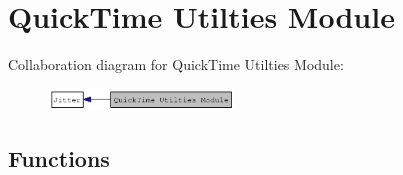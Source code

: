 \hypertarget{group__qtutilsmod}{
\section{QuickTime Utilties Module}
\label{group__qtutilsmod}
}


Collaboration diagram for QuickTime Utilties Module:\nopagebreak
\begin{figure}[H]
\begin{center}
\leavevmode
\includegraphics[width=140pt]{group__qtutilsmod}
\end{center}
\end{figure}
\subsection*{Functions}
